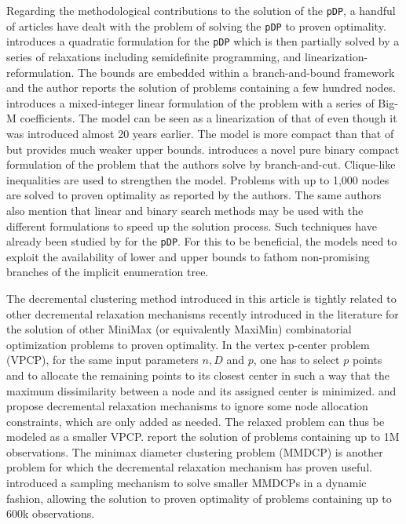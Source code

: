 \documentclass[a4paper,10pt]{article}
\newcommand{\pDP}{\texttt{pDP}}
\begin{document}
Regarding the methodological contributions to the solution of the \pDP{}, a handful of articles have dealt with the problem of solving the \pDP{} to proven optimality. \citet{Pisinger2006Upper} introduces a quadratic formulation for the \pDP{} which is then partially solved by a series of relaxations including semidefinite programming, and linearization-reformulation. The bounds are embedded within a branch-and-bound framework and the author reports the solution of problems containing a few hundred nodes. \citet{Kuby1987Programming} introduces a mixed-integer linear formulation of the problem with a series of Big-M coefficients. The model can be seen as a linearization of that of \citet{Pisinger2006Upper} even though it was introduced almost 20 years earlier. The model is more compact than that of \citet{Pisinger2006Upper} but provides much weaker upper bounds. \citet{Sayah2017new} introduces a novel pure binary compact formulation of the problem that the authors solve by branch-and-cut. Clique-like inequalities are used to strengthen the model. Problems with up to 1,000 nodes are solved to proven optimality as reported by the authors. The same authors also mention that linear and binary search methods may be used with the different formulations to speed up the solution process. Such techniques have already been studied by \citet{Chandrasekaran1981Location, Pisinger2006Upper} for the \pDP{}. For this to be beneficial, the models need to exploit the availability of lower and upper bounds to fathom non-promising branches of the implicit enumeration tree.

The decremental clustering method introduced in this article is tightly related to other decremental relaxation mechanisms recently introduced in the literature for the solution of other MiniMax (or equivalently MaxiMin) combinatorial optimization problems to proven optimality. In the vertex p-center problem (VPCP), for the same input parameters $n, D$ and $p$, one has to select $p$ points and to allocate the remaining points to its closest center in such a way that the maximum dissimilarity between a node and its assigned center is minimized. \citet{Chen2009New} and \citet{Contardo2019scalable} propose decremental relaxation mechanisms to ignore some node allocation constraints, which are only added as needed. The relaxed problem can thus be modeled as a smaller VPCP. \citet{Contardo2019scalable} report the solution of problems containing up to 1M observations. The minimax diameter clustering problem (MMDCP) is another problem for which the decremental relaxation mechanism has proven useful. \citet{Aloise2018sampling} introduced a sampling mechanism to solve smaller MMDCPs in a dynamic fashion, allowing the solution to proven optimality of problems containing up to 600k observations.
\end{document}
